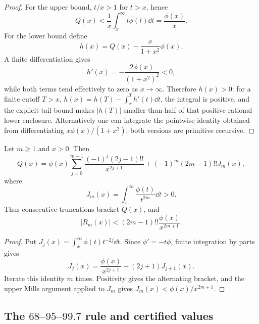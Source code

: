 \begin{proof}
For the upper bound, $t/x>1$ for $t>x$, hence
\[
 Q(x)<\frac1x\int_x^\infty t\phi(t)\dd t=\frac{\phi(x)}x.
\]
For the lower bound define
\[
 h(x)=Q(x)-\frac{x}{1+x^2}\phi(x).
\]
A finite differentiation gives
\[
 h'(x)=-\frac{2\phi(x)}{(1+x^2)^2}<0,
\]
while both terms tend effectively to zero as $x\to\infty$.  Therefore $h(x)>0$: for a finite cutoff $T>x$, $h(x)=h(T)-\int_x^T h'(t)\dd t$, the integral is positive, and the explicit tail bound makes $|h(T)|$ smaller than half of that positive rational lower enclosure.  Alternatively one can integrate the pointwise identity obtained from differentiating $x\phi(x)/(1+x^2)$; both versions are primitive recursive.
\end{proof}

\begin{theorem}\label{thm:mills-expansion}
Let $m\ge1$ and $x>0$.  Then
\begin{equation}\label{eq:tail-expansion}
 Q(x)=\phi(x)\sum_{j=0}^{m-1}
   \frac{(-1)^j(2j-1)!!}{x^{2j+1}}
   +(-1)^m(2m-1)!!J_m(x),
\end{equation}
where
\[
 J_m(x)=\int_x^\infty\frac{\phi(t)}{t^{2m}}\dd t>0.
\]
Thus consecutive truncations bracket $Q(x)$, and
\begin{equation}\label{eq:tail-expansion-error}
 |R_m(x)|<(2m-1)!!\frac{\phi(x)}{x^{2m+1}}.
\end{equation}
\end{theorem}

\begin{proof}
Put $J_j(x)=\int_x^\infty\phi(t)t^{-2j}\dd t$.  Since $\phi'=-t\phi$, finite integration by parts gives
\[
 J_j(x)=\frac{\phi(x)}{x^{2j+1}}-(2j+1)J_{j+1}(x).
\]
Iterate this identity $m$ times.  Positivity gives the alternating bracket, and the upper Mills argument applied to $J_m$ gives
$J_m(x)<\phi(x)/x^{2m+1}$.
\end{proof}

\subsection{The \texorpdfstring{$68$--$95$--$99.7$}{68--95--99.7} rule and certified values}

